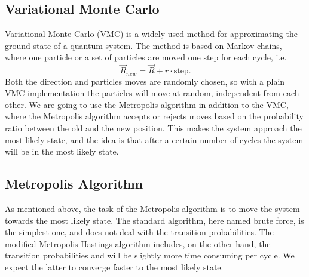 \documentclass[norsk,a4paper,12pt]{article}
\begin{document}
\subsection{Variational Monte Carlo}\label{VMC}
Variational Monte Carlo (VMC) is a widely used method for approximating the ground state of a quantum system. The method is based on Markov chains, where one particle or a set of particles are moved one step for each cycle, i.e.
\begin{equation}
\vec{R}_{new} = \vec{R} + r\cdot \text{step}.
\end{equation}
Both the direction and particles moves are randomly chosen, so with a plain VMC implementation the particles will move at random, independent from each other. We are going to use the Metropolis algorithm in addition to the VMC, where the Metropolis algorithm accepts or rejects moves based on the probability ratio between the old and the new position. This makes the system approach the most likely state, and the idea is that after a certain number of cycles the system will be in the most likely state. 

\subsection{Metropolis Algorithm} \label{sec:Metropolis}
As mentioned above, the task of the Metropolis algorithm is to move the system towards the most likely state. The standard algorithm, here named brute force, is the simplest one, and does not deal with the transition probabilities. The modified Metropolis-Hastings algorithm includes, on the other hand, the transition probabilities and will be slightly more time consuming per cycle. We expect the latter to converge faster to the most likely state. 
\end{document}
